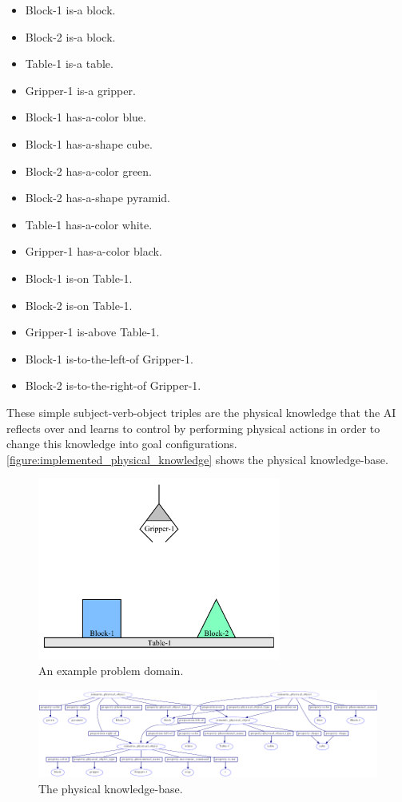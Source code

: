 \begin{itemize}
\item Block-1 is-a block.
\item Block-2 is-a block.
\item Table-1 is-a table.
\item Gripper-1 is-a gripper.
\item Block-1 has-a-color blue.
\item Block-1 has-a-shape cube.
\item Block-2 has-a-color green.
\item Block-2 has-a-shape pyramid.
\item Table-1 has-a-color white.
\item Gripper-1 has-a-color black.
\item Block-1 is-on Table-1.
\item Block-2 is-on Table-1.
\item Gripper-1 is-above Table-1.
\item Block-1 is-to-the-left-of Gripper-1.
\item Block-2 is-to-the-right-of Gripper-1.
\end{itemize}
These simple subject-verb-object triples are the physical knowledge
that the AI reflects over and learns to control by performing physical
actions in order to change this knowledge into goal configurations.
{\mbox{\autoref{figure:implemented_physical_knowledge}}} shows the
physical knowledge-base.
\begin{figure}
\begin{center}
\includegraphics[width=8cm]{gfx/blocks_world_example-1}
\end{center}
\caption[An example problem domain.]{An example problem domain.}
\label{figure:an_example_problem_domain}
\end{figure}
\begin{figure}
\begin{center}
\includegraphics[width=24cm]{gfx/implemented_physical_knowledge}
\end{center}
\hspace{4cm}\parbox{15cm}{\caption[The physical knowledge-base.]{The
    physical
    knowledge-base.}\label{figure:implemented_physical_knowledge}}
\end{figure}

